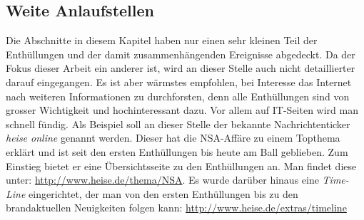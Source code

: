\subsection{Weite Anlaufstellen}
Die Abschnitte in diesem Kapitel haben nur einen sehr kleinen Teil der Enthüllungen und der damit zusammenhängenden Ereignisse abgedeckt. Da der Fokus dieser Arbeit ein anderer ist, wird an dieser Stelle auch nicht detaillierter darauf eingegangen. Es ist aber wärmstes empfohlen, bei Interesse das Internet nach weiteren Informationen zu durchforsten, denn alle Enthüllungen sind von grosser Wichtigkeit und hochinteressant dazu. Vor allem auf IT-Seiten wird man schnell fündig. Als Beispiel soll an dieser Stelle der bekannte Nachrichtenticker \textit{heise online} genannt werden. Dieser hat die NSA-Affäre zu einem Topthema erklärt und ist seit den ersten Enthüllungen bis heute am Ball geblieben. Zum Einstieg bietet er eine Übersichtsseite zu den Enthüllungen an. Man findet diese unter: \url{http://www.heise.de/thema/NSA}. Es wurde darüber hinaus eine \textit{Time-Line} eingerichtet, der man von den ersten Enthüllungen bis zu den brandaktuellen Neuigkeiten folgen kann: \url{http://www.heise.de/extras/timeline}